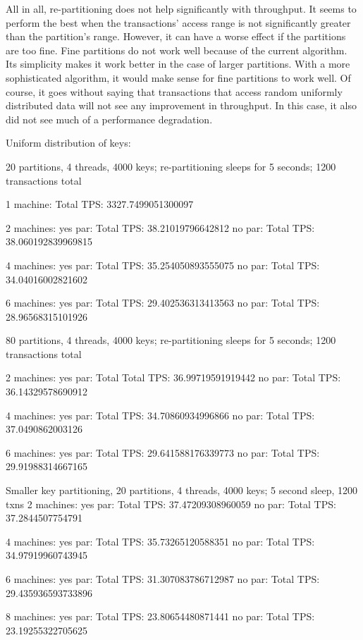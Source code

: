 \documentclass[a4paper, 10pt, notitlepage]{article}
\begin{document}
All in all, re-partitioning does not help significantly with throughput. It seems to perform the best when 
the transactions' access range is not significantly greater than the partition's range. However, it can have
a worse effect if the partitions are too fine. Fine partitions do not work well because of the current algorithm.
Its simplicity makes it work better in the case of larger partitions. With a more sophisticated algorithm,
it would make sense for fine partitions to work well. Of course, it goes without saying that transactions that
access random uniformly distributed data will not see any improvement in throughput. In this case, it also
did not see much of a performance degradation.


\iffalse
Uniform distribution of keys:

20 partitions, 4 threads, 4000 keys; re-partitioning sleeps for 5 seconds; 1200 transactions total

1 machine:
Total TPS: 3327.7499051300097

2 machines:
yes par: Total TPS: 38.21019796642812
no par: Total TPS: 38.060192839969815

4 machines:
yes par: Total TPS: 35.254050893555075
no par: Total TPS: 34.04016002821602

6 machines:
yes par: Total TPS: 29.402536313413563
no par: Total TPS: 28.96568315101926


80 partitions, 4 threads, 4000 keys; re-partitioning sleeps for 5 seconds; 1200 transactions total

2 machines:
yes par: Total Total TPS: 36.99719591919442
no par: Total TPS: 36.14329578690912

4 machines:
yes par: Total TPS: 34.70860934996866
no par: Total TPS: 37.0490862003126

6 machines:
yes par: Total TPS: 29.641588176339773
no par: Total TPS: 29.91988314667165

Smaller key partitioning, 20 partitions, 4 threads, 4000 keys; 5 second sleep, 1200 txns
2 machines:
yes par: Total TPS: 37.47209308960059
no par: Total TPS: 37.2844507754791

4 machines:
yes par: Total TPS: 35.73265120588351
no par: Total TPS: 34.97919960743945

6 machines:
yes par: Total TPS: 31.307083786712987
no par: Total TPS: 29.435936593733896

8 machines:
yes par: Total TPS: 23.80654480871441
no par: Total TPS: 23.19255322705625
\end{document}
